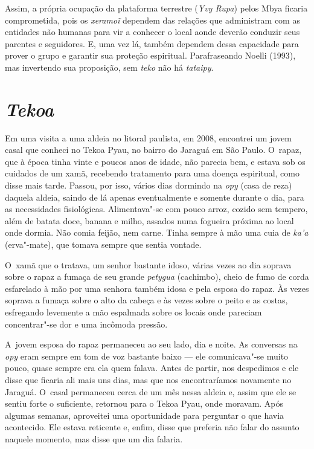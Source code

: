 Assim, a própria ocupação da plataforma terrestre (\emph{Yvy Rupa}) pelos Mbya
ficaria comprometida, pois os \emph{xeramoĩ} dependem
das relações que administram com as entidades não humanas para vir a
conhecer o local aonde deverão conduzir seus parentes e seguidores. E,
uma vez lá, também dependem dessa capacidade para prover o grupo e
garantir sua proteção espiritual. Parafraseando Noelli (1993), mas
invertendo sua proposição, sem \emph{teko} não há \emph{tataipy}.

\section{\emph{Tekoa}}

Em uma visita a uma aldeia no litoral paulista, em 2008, encontrei um
jovem casal que conheci no Tekoa Pyau, no bairro do Jaraguá em São
Paulo. O~rapaz, que à época tinha vinte e poucos anos de idade, não
parecia bem, e estava sob os cuidados de um xamã, recebendo tratamento
para uma doença espiritual, como disse mais tarde. Passou, por isso,
vários dias dormindo na \emph{opy} (casa de reza) daquela aldeia, saindo de lá
apenas eventualmente e somente durante o dia, para as necessidades
fisiológicas. Alimentava"-se com pouco arroz, cozido sem tempero, além
de batata doce, banana e milho, assados numa fogueira próxima ao local
onde dormia. Não comia feijão, nem carne. Tinha sempre à mão uma cuia
de \emph{ka’a} (erva"-mate), que tomava sempre que sentia vontade. 

O~xamã que o tratava, um senhor bastante idoso, várias vezes ao dia
soprava sobre o rapaz a fumaça de seu grande \emph{petygua} (cachimbo),
cheio de fumo de corda esfarelado à mão por uma senhora também idosa e
pela esposa do rapaz. Às vezes soprava a fumaça sobre o alto da cabeça
e às vezes sobre o peito e as costas, esfregando levemente a mão
espalmada sobre os locais onde pareciam concentrar"-se dor e uma
incômoda pressão.

A~jovem esposa do rapaz permaneceu ao seu lado, dia e noite. As
conversas na \emph{opy} eram sempre em tom de voz bastante baixo --- ele
comunicava"-se muito pouco, quase sempre era ela quem falava. Antes de
partir, nos despedimos e ele disse que ficaria ali mais uns dias, mas
que nos encontraríamos novamente no Jaraguá. O~casal permaneceu cerca
de um mês nessa aldeia e, assim que ele se sentiu forte o suficiente,
retornou para o Tekoa Pyau, onde moravam. Após algumas semanas,
aproveitei uma oportunidade para perguntar o que havia acontecido. Ele
estava reticente e, enfim, disse que preferia não falar do assunto
naquele momento, mas disse que um dia falaria.

